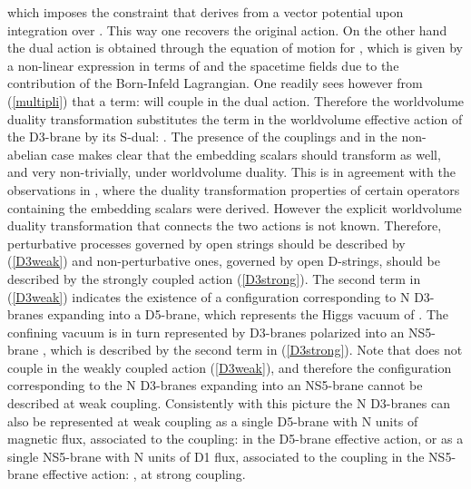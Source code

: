 \documentclass[12pt,a4paper]{article}
\begin{document}
\noindent which imposes the constraint that 
\coordHE{} 
derives from
a vector potential upon integration over
\coordHE{}. This way one recovers the original action. On
the other hand the dual action is obtained through the equation
of motion for \coordHE{}, which is given by a non-linear expression 
in terms of \coordHE{} and the spacetime fields 
due to the contribution of the Born-Infeld Lagrangian.
One readily sees however from (\ref{multipli}) that a term: 
\coordHE{} will
couple in the dual action. Therefore the worldvolume duality
transformation substitutes the term 
\coordHE{} in the worldvolume
effective action of the D3-brane by its S-dual:
\coordHE{}. 
The presence of the couplings \coordHE{} and
\coordHE{} in the non-abelian case makes clear
that the embedding scalars should transform as well, and very
non-trivially, under worldvolume duality. 
This is in agreement with the observations in \cite{TvR},
where the duality transformation properties of certain operators
containing the embedding scalars were derived.
However the explicit worldvolume duality transformation that connects
the two actions is not known.
Therefore, perturbative processes governed by open strings should be
described by (\ref{D3weak}) and non-perturbative ones, governed by
open D-strings, should be described by the strongly coupled action
(\ref{D3strong}). The second term in (\ref{D3weak}) indicates the
existence of a configuration corresponding to N D3-branes expanding
into a D5-brane, which represents the Higgs vacuum of \cite{PS}.
The confining vacuum is in turn represented by D3-branes polarized
into an NS5-brane \cite{PS}, which is described by the second term
in (\ref{D3strong}). Note that \coordHE{} does not couple in the
weakly coupled action (\ref{D3weak}), and therefore the configuration
corresponding to the N D3-branes expanding into an NS5-brane cannot
be described at weak coupling. Consistently with this picture the
N D3-branes can also be represented at weak coupling as a single D5-brane
with N units of magnetic flux, associated to the coupling:
\coordHE{} in the D5-brane effective action,
or as a single NS5-brane with N units of D1 flux, associated to the
coupling in the NS5-brane effective action:
\coordHE{}, at strong coupling.
\end{document}

